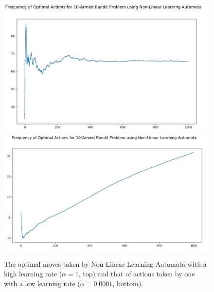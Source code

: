 \documentclass{article}
\begin{document}
\begin{enumerate}
	\begin{figure}[h]
	\centering
	\includegraphics[scale=0.2]{nlla_opt_hlr}
	\includegraphics[scale=0.2]{nlla_opt_llr}
	\caption{The optimal moves taken by Non-Linear Learning Automata with a high learning rate ($\alpha=1$, top) and that of actions taken by one with a low learning rate ($\alpha=0.0001$, bottom).}
	\end{figure}
	

\end{enumerate}
\end{document}
